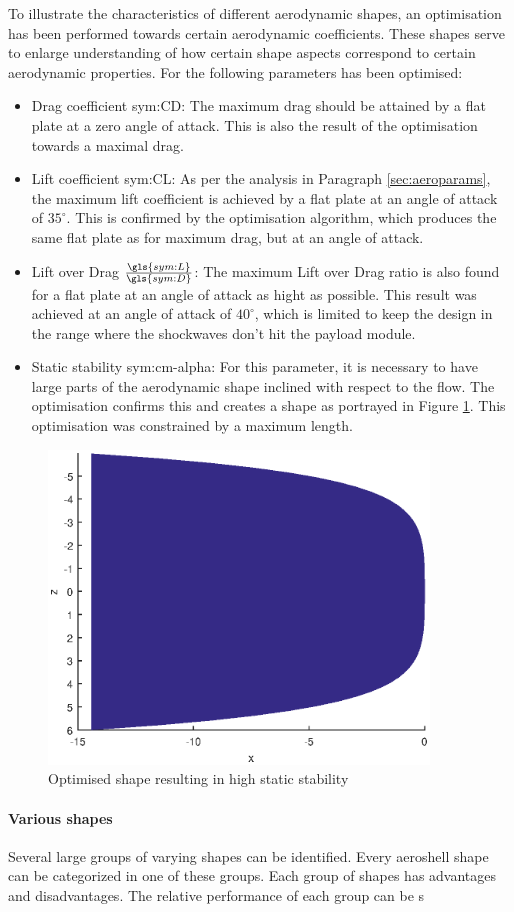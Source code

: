 To illustrate the characteristics of different aerodynamic shapes, an optimisation has been performed towards certain aerodynamic coefficients. These shapes serve to enlarge understanding of how certain shape aspects correspond to certain aerodynamic properties. For the following parameters has been optimised:
\begin{itemize}
	\item Drag coefficient \gls{sym:CD}: The maximum drag should be attained by a flat plate at a zero angle of attack. This is also the result of the optimisation towards a maximal drag.
	\item Lift coefficient \gls{sym:CL}: As per the analysis in Paragraph \ref{sec:aeroparams}, the maximum lift coefficient is achieved by a flat plate at an angle of attack of $35^\circ$. This is confirmed by the optimisation algorithm, which produces the same flat plate as for maximum drag, but at an angle of attack.
	\item Lift over Drag $\frac{\gls{sym:L}}{\gls{sym:D}}$: The maximum Lift over Drag ratio is also found for a flat plate at an angle of attack as hight as possible. This result was achieved at an angle of attack of $40^\circ$, which is limited to keep the design in the range where the shockwaves don't hit the payload module.
	\item Static stability \gls{sym:cm-alpha}: For this parameter, it is necessary to have large parts of the aerodynamic shape inclined with respect to the flow. The optimisation confirms this and creates a shape as portrayed in Figure \ref{fig:highcmalphashape}. This optimisation was constrained by a maximum length.
\end{itemize}

\begin{figure} \label{fig:highcmalphashape}
	\includegraphics[width=0.9\textwidth]{./Figure/Aerodynamics/cmalphamax.eps}
	\caption{Optimised shape resulting in high static stability}
\end{figure}
	
\paragraph{Various shapes}
Several large groups of varying shapes can be identified. Every aeroshell shape can be categorized in one of these groups.  Each group of shapes has advantages and disadvantages. The relative performance of each group can be s

